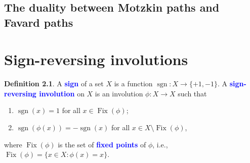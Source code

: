 \documentclass[oneside]{book}
\numberwithin{equation}{section}
\theoremstyle{definition}
\newtheorem{defn}[thm]{Definition}
\newcommand\Fix{\operatorname{Fix}}
\newcommand\sgn{\operatorname{sgn}}
\renewcommand\emph[1]{\textcolor{blue}{\bf #1}}
\begin{document}
\section{The duality between Motzkin paths and Favard paths}










\newpage

\appendix

\chapter{Sign-reversing involutions}
\label{sec:sign-revers-invol}

\begin{defn}
  A \emph{sign} of a set \( X \) is a function
  \( \sgn:X \to \{+1,-1\} \). A \emph{sign-reversing involution} on
  \( X \) is an involution \( \phi:X\to X \) such that
  \begin{enumerate}
  \item \( \sgn(x)=1 \) for all \( x\in \Fix(\phi) \);
  \item \( \sgn(\phi(x)) = -\sgn(x) \) for all
  \( x\in X \setminus \Fix(\phi) \),
  \end{enumerate}
  where \( \Fix(\phi) \) is the set of \emph{fixed points} of
  \( \phi \), i.e., \( \Fix(\phi) = \{x\in X: \phi(x) = x \} \).
\end{defn}
\end{document}
